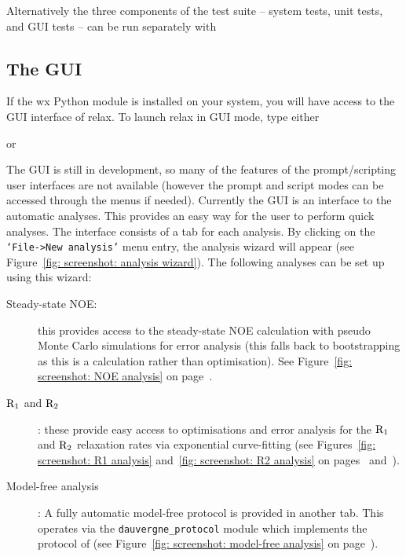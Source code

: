 
Alternatively the three components of the test suite -- system tests, unit tests, and GUI tests -- can be run separately with






\subsection{The GUI}

If the wx Python module is installed on your system, you will have access to the GUI interface of relax.  To launch relax in GUI mode, type either


or


The GUI is still in development, so many of the features of the prompt/scripting user interfaces are not available (however the prompt and script modes can be accessed through the menus if needed).  Currently the GUI is an interface to the automatic analyses.  This provides an easy way for the user to perform quick analyses.  The interface consists of a tab for each analysis.  By clicking on the \texttt{`File->New analysis'} menu entry, the analysis wizard will appear (see Figure~\ref{fig: screenshot: analysis wizard}).  The following analyses can be set up using this wizard:

\begin{description}
\item[Steady-state NOE:]  this provides access to the steady-state NOE calculation with pseudo Monte Carlo simulations for error analysis (this falls back to bootstrapping as this is a calculation rather than optimisation).  See Figure~\ref{fig: screenshot: NOE analysis} on page~\pageref{fig: screenshot: NOE analysis}.
\item[$\mathrm{R}_1$ and $\mathrm{R}_2$]:  these provide easy access to optimisations and error analysis for the $\mathrm{R}_1$ and $\mathrm{R}_2$ relaxation rates via exponential curve-fitting (see Figures~\ref{fig: screenshot: R1 analysis} and~\ref{fig: screenshot: R2 analysis} on pages~\pageref{fig: screenshot: R1 analysis} and~\pageref{fig: screenshot: R2 analysis}).
\item[Model-free analysis]:  A fully automatic model-free protocol is provided in another tab.  This operates via the \texttt{dauvergne\_protocol} module which implements the protocol of \cite{dAuvergneGooley08b} (see Figure~\ref{fig: screenshot: model-free analysis} on page~\pageref{fig: screenshot: model-free analysis}).
\end{description}

